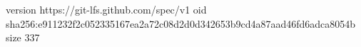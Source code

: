 version https://git-lfs.github.com/spec/v1
oid sha256:e911232f2c052335167ea2a72c08d2d0d342653b9cd4a87aad46fd6adca8054b
size 337
